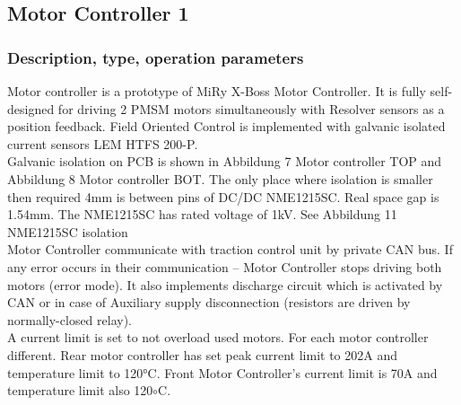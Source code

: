 \subsection{Motor Controller 1}

\subsubsection{Description, type, operation parameters}
Motor controller is a prototype of MiRy X-Boss Motor Controller. It is fully self-designed for driving 2 PMSM motors simultaneously with Resolver sensors as a position feedback. Field Oriented Control is implemented with galvanic isolated current sensors LEM HTFS 200-P.\\

Galvanic isolation on PCB is shown in Abbildung 7 Motor controller TOP and Abbildung 8 Motor controller BOT. The only place where isolation is smaller then required 4mm is between pins of DC/DC NME1215SC. Real space gap is 1.54mm. The NME1215SC has rated voltage of 1kV. See Abbildung 11 NME1215SC isolation\\

Motor Controller communicate with traction control unit by private CAN bus. If any error occurs in their communication – Motor Controller stops driving both motors (error mode). It also implements discharge circuit which is activated by CAN or in case of Auxiliary supply disconnection (resistors are driven by normally-closed relay).\\

A current limit is set to not overload used motors. For each motor controller different. Rear motor controller has set peak current limit to 202A and temperature limit to 120°C. Front Motor Controller’s current limit is 70A and temperature limit also 120$\circ$C.\\


